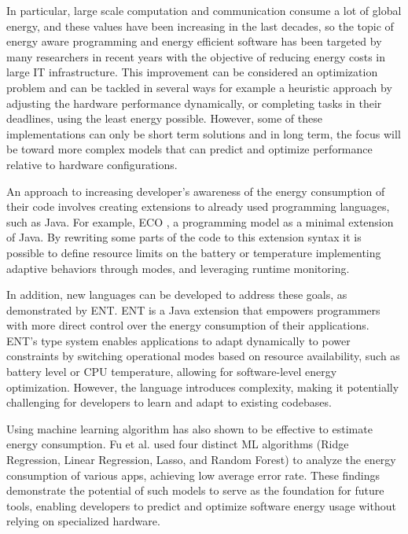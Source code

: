 \documentclass[sigplan]{acmart}
\begin{document}
In particular, large scale computation and communication consume a lot of global energy, and these values have been increasing in the last decades, so the topic of energy aware programming and energy efficient software has been targeted by many researchers in recent years with the objective of reducing energy costs in large IT infrastructure\cite{8880037}.
This improvement can be considered an optimization problem and can be tackled in several ways for example a heuristic approach by adjusting the hardware performance dynamically, or completing tasks in their deadlines, using the least energy possible. However, some of these implementations can only be short term solutions and in long term, the focus will be toward more complex models that can predict and optimize performance relative to hardware configurations\cite{10.1145/1666420.1666438}. 

An approach to increasing developer's awareness of the energy consumption of their code involves creating extensions to already used programming languages, such as Java. For example, ECO \cite{7194624}, a programming model as a minimal extension of Java. By rewriting some parts of the code to this extension syntax it is possible to define resource limits on the battery or temperature implementing adaptive behaviors through modes, and leveraging runtime monitoring.

In addition, new languages can be developed to address these goals, as demonstrated by ENT\cite{10.1145/3062341.3062356}. ENT is a Java extension that empowers programmers with more direct control over the energy consumption of their applications. ENT’s type system enables applications to adapt dynamically to power constraints by switching operational modes based on resource availability, such as battery level or CPU temperature, allowing for software-level energy optimization. However, the language introduces complexity, making it potentially challenging for developers to learn and adapt to existing codebases. 

Using machine learning algorithm has also shown to be effective to estimate energy consumption. Fu et al. \cite{8726531} used four distinct ML algorithms (Ridge Regression, Linear Regression, Lasso, and Random Forest) to analyze the energy consumption of various apps, achieving low average error rate. These findings demonstrate the potential of such models to serve as the foundation for future tools, enabling developers to predict and optimize software energy usage without relying on specialized hardware.
\end{document}

